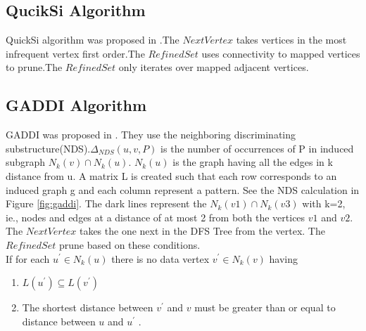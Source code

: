 \subsection{QucikSi Algorithm}
\label{sec:qsi}
\hspace{10mm}QuickSi algorithm was proposed in \cite{QSI}.The $NextVertex$ takes vertices in the most infrequent vertex first order.The $RefinedSet$ uses connectivity to mapped vertices to prune.The $RefinedSet$ only iterates over mapped adjacent vertices.
\subsection{GADDI Algorithm}
\label{sec:gaddi}
	\hspace{10mm}GADDI was proposed in \cite{GAD}. They use the neighboring discriminating substructure(NDS).$\Delta_{NDS}(u,v,P)$ is the number of occurrences of P in induced subgraph $N_k(v) \cap N_k(u)$. $N_k(u) $ is the graph having all the edges in k distance from u. A matrix L is created such that each row corresponds to an induced graph g and each column represent a pattern. See the NDS calculation in Figure \ref{fig:gaddi}. The dark lines represent the $N_k(v1) \cap N_k(v3)$ with k=2, ie., nodes and edges at a distance of at most 2 from both the vertices $v1$ and $v2$. The $NextVertex$ takes the one next in the DFS Tree from  the vertex. The $RefinedSet$ prune based on these conditions.
\\	\hspace{10mm}If for each $u^{'} \in N_{k}(u)$ there is no data vertex $v^{'} \in N_{k}(v)$ having
	\begin{enumerate}
 \item $L(u^{'}) \subseteq L(v^{'})$ 
 \item The shortest distance between $v^{'}$ and $v$ must be greater than or equal to distance between $u$ and $u^{'}$ .
 \end{enumerate}
